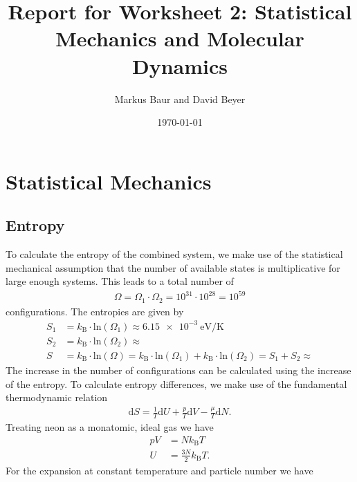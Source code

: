\documentclass[a4paper,10pt,bibtotoc]{scrartcl}
\begin{document}
\titlehead{Simulation Methods in Physics I \hfill WS 2019/2010}
\title{Report for Worksheet 2: Statistical Mechanics and Molecular Dynamics}
\author{Markus Baur and David Beyer}
\date{\today}
\maketitle

\tableofcontents

\section{Statistical Mechanics}
\subsection{Entropy}
To calculate the entropy of the combined system, we make use of the statistical mechanical assumption that the number of available states is multiplicative for large enough systems. 
This leads to a total number of
\begin{align}
 \Omega = \Omega_1\cdot\Omega_2 = 10^{31}\cdot 10^{28}= 10^{59}
\end{align}
configurations. 
The entropies are given by
\begin{align*}
S_1 &= k_\mathrm{B}\cdot \mathrm{ln}\left(\Omega_1\right) \approx \SI[per-mode=reciprocal]{6.15e-3}{\electronvolt\per\kelvin}\\
S_2 &= k_\mathrm{B}\cdot \mathrm{ln}\left(\Omega_2\right) \approx\\
S &= k_\mathrm{B}\cdot \mathrm{ln}\left(\Omega\right) = k_\mathrm{B}\cdot \mathrm{ln}\left(\Omega_1\right) + k_\mathrm{B}\cdot \mathrm{ln}\left(\Omega_2\right) = S_1 + S_2\approx 
\end{align*}
The increase in the number of configurations can be calculated using the increase of the entropy.
To calculate entropy differences, we make use of the fundamental thermodynamic relation
\begin{align}
\mathrm{d}S = \frac{1}{T}\mathrm{d}U + \frac{p}{T}\mathrm{d}V - \frac{\mu}{T}\mathrm{d}N.
\end{align}
Treating neon as a monatomic, ideal gas we have
\begin{align}
 pV &= Nk_\mathrm{B}T\\
 U &= \frac{3N}{2}k_\mathrm{B} T.
\end{align}
For the expansion at constant temperature and particle number we have
\end{document}
